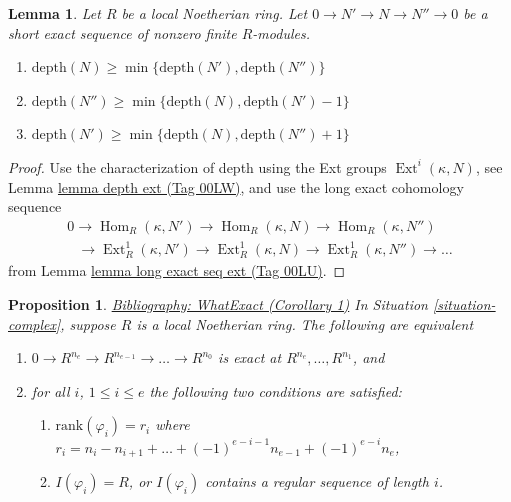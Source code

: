 \documentclass{amsart}
\newenvironment{reference}{\comment}{\endcomment}
\theoremstyle{plain}
\newtheorem{proposition}[subsection]{Proposition}
\newtheorem{lemma}[subsection]{Lemma}
\theoremstyle{definition}
\theoremstyle{remark}
\numberwithin{equation}{subsection}
\def\Hom{\mathop{\mathrm{Hom}}\nolimits}
\def\Ext{\mathop{\mathrm{Ext}}\nolimits}
\begin{document}
\begin{lemma}
\label{lemma-depth-in-ses}
Let $R$ be a local Noetherian ring. Let $0 \to N' \to N \to N'' \to 0$
be a short exact sequence of nonzero finite $R$-modules.
\begin{enumerate}
\item
$\text{depth}(N) \geq \min\{\text{depth}(N'), \text{depth}(N'')\}$
\item
$\text{depth}(N'') \geq \min\{\text{depth}(N), \text{depth}(N') - 1\}$
\item
$\text{depth}(N') \geq \min\{\text{depth}(N), \text{depth}(N'') + 1\}$
\end{enumerate}
\end{lemma}

\begin{proof}
Use the characterization of depth using the Ext groups
$\Ext^i(\kappa, N)$, see Lemma \href{https://stacks.math.columbia.edu/tag/00LW}{lemma depth ext (Tag 00LW)},
and use the long exact cohomology sequence
$$
\begin{matrix}
0
\to \Hom_R(\kappa, N')
\to \Hom_R(\kappa, N)
\to \Hom_R(\kappa, N'')
\\
\phantom{0\ }
\to \Ext^1_R(\kappa, N')
\to \Ext^1_R(\kappa, N)
\to \Ext^1_R(\kappa, N'')
\to \ldots
\end{matrix}
$$
from Lemma \href{https://stacks.math.columbia.edu/tag/00LU}{lemma long exact seq ext (Tag 00LU)}.
\end{proof}


\begin{proposition}
\label{proposition-what-exact}
\begin{reference}
\href{https://stacks.math.columbia.edu/bibliography}{Bibliography: WhatExact (Corollary 1)}
\end{reference}
In Situation \ref{situation-complex}, suppose $R$ is
a local Noetherian ring. The following are equivalent
\begin{enumerate}
\item $0 \to R^{n_e} \to R^{n_{e-1}} \to \ldots \to R^{n_0}$
is exact at $R^{n_e}, \ldots, R^{n_1}$, and
\item for all $i$, $1 \leq i \leq e$
the following two conditions are satisfied:
\begin{enumerate}
\item $\text{rank}(\varphi_i) = r_i$ where
$r_i = n_i - n_{i + 1} + \ldots + (-1)^{e-i-1} n_{e-1} + (-1)^{e-i} n_e$,
\item $I(\varphi_i) = R$, or $I(\varphi_i)$ contains a
regular sequence of length $i$.
\end{enumerate}
\end{enumerate}
\end{proposition}
\end{document}
